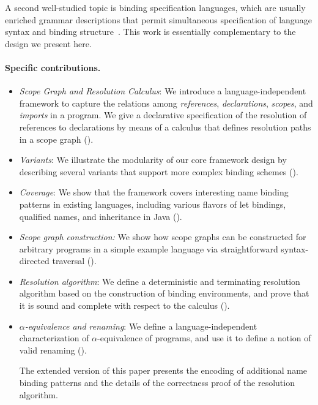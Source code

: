 A second well-studied topic is binding specification languages, 
which are usually enriched grammar descriptions that permit simultaneous 
specification of language syntax and binding
structure~\cite{SewellNOPRSS10,DybvigHB92,HermanW08,StansiferW14,WeirichYS11}.
This work is essentially complementary to the design we present here. 

\paragraph{Specific contributions.}\label{contributions}

\begin{itemize}
  
 \item \emph{Scope Graph and Resolution Calculus}: We introduce a
 language-independent framework to capture the relations among
 \emph{references}, \emph{declarations}, \emph{scopes}, and  \emph{imports} in a
 program. 
We give a declarative specification of the resolution of
 references to declarations by means of a calculus that defines resolution paths
 in a scope graph ().

 \item \emph{Variants}: We illustrate the modularity of our core framework design
by describing several variants that support more complex binding 
schemes ().

 \item \emph{Coverage}: We show that the framework covers interesting  name
 binding patterns in existing languages, including various flavors of let bindings,
 qualified names, and inheritance in Java ().
  
 \item \emph{Scope graph construction:} We show how scope graphs can be constructed
 for arbitrary programs in a simple example language via straightforward syntax-directed traversal ().

 \item \emph{Resolution algorithm}: We define a deterministic and terminating
 resolution algorithm based on the construction of binding environments, and
 prove that it is sound and complete with respect to the calculus
 ().
 
 \item \emph{$\alpha$-equivalence and renaming}: We define a language-independent
 characterization of $\alpha$-equivalence of programs, and use it to define a 
 notion of valid renaming ().

The extended version of this paper \cite{TUD-SERG-2015-001-local} presents the encoding 
of additional name binding patterns and the details of the correctness proof 
of the resolution algorithm.

\end{itemize}


